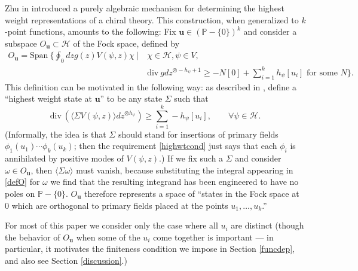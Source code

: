 \documentclass[a4paper,12pt]{article}
\newcommand{\Span}{\mathrm{Span}}
\newcommand{\uu}{{\mathbf u}}
\newcommand{\PP}{{\mathbb P}}
\newcommand{\F}{{\mathcal H}}
\newcommand{\IP}[1]{\langle#1\rangle}
\newcommand{\ci}{\oint}
\newcommand{\Div}{\mathrm{div}\ }
\begin{document}
Zhu in \cite{Zhu}
introduced a purely algebraic mechanism for determining the highest weight 
representations of a chiral theory.  This construction, when generalized
to $k$-point functions, amounts to the following:  Fix $\uu \in (\PP - \{0\})^k$ and 
consider a subspace $O_\uu \subset \F$ of the Fock space, defined by
\begin{equation} \label{defO}
\begin{split}
O_\uu = \Span \ \Big\{ \ci_0 dz g(z) V(\psi, z) \chi \ \Big\vert \ &\chi \in \F, \psi \in V, \\
                    & \Div g dz^{\otimes -h_\psi+1} \ge -N[0] + \sum_{i=1}^k h_\psi [u_i] \textrm{    for some } N\Big\}.
\end{split}
\end{equation}
This definition can be motivated in the following way:  
as described in \cite{GG}, define a ``highest weight state at $\uu$'' to be 
any state $\Sigma$ such that
\begin{equation} \label{highwtcond}
\Div \left( \IP{ \Sigma V(\psi, z) } dz^{\otimes h_\psi} \right) \ge \sum_{i=1}^k -h_\psi [u_i], \qquad \forall \psi \in \F.
\end{equation}
(Informally, the idea is that $\Sigma$ should stand for insertions
of primary fields $\phi_1(u_1) \cdots \phi_k(u_k)$; then the requirement
\eqref{highwtcond} just says that each $\phi_i$ is annihilated by positive
modes of $V(\psi, z)$.) 
If we fix such a $\Sigma$ and consider $\omega \in O_\uu$, then $\IP{\Sigma \omega}$ must vanish, 
because substituting
the integral appearing in 
\eqref{defO} for $\omega$ we find that the resulting integrand has been engineered to have no poles
on $\PP - \{0\}$.  $O_\uu$ therefore represents a space of 
``states in the Fock space at $0$ 
which are orthogonal to primary fields placed at the points $u_1, \dots, u_k$.''

For most of this paper we consider only the case where all $u_i$ are distinct (though the behavior
of $O_\uu$ when some of the $u_i$ come together is important --- in particular, it motivates
the finiteness condition we impose in Section \ref{funcdep}, and also see Section \ref{discussion}.)
\end{document}
